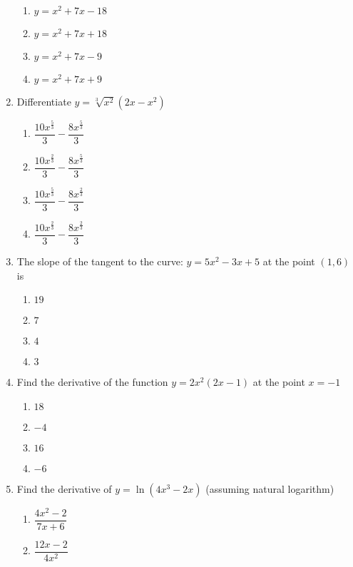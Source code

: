 \begin{multicols}{2}
\begin{enumerate}[label={\arabic*.}]
\begin{enumerate}[label={\Alph*.}]
        \item \(y = {x}^{2}+7x-18\)
        \item \(y = {x}^{2}+7x+18\)
        \item \(y = {x}^{2}+7x-9\)
        \item \(y = {x}^{2}+7x+9\)
      \end{enumerate}
    \item Differentiate \(y = \sqrt[3]{{x}^{2}}(2x-{x}^{2})\)
      \begin{enumerate}[label={\Alph*.}]
        \item \(\dfrac{10{x}^{\frac{5}{3}}}{3} -\dfrac{8{x}^{\frac{5}{3}}}{3}\) %
        \item \(\dfrac{10{x}^{\frac{2}{3}}}{3} -\dfrac{8{x}^{\frac{5}{3}}}{3}\) %
        \item \(\dfrac{10{x}^{\frac{5}{3}}}{3} -\dfrac{8{x}^{\frac{2}{3}}}{3}\)
        \item \(\dfrac{10{x}^{\frac{2}{3}}}{3} -\dfrac{8{x}^{\frac{2}{3}}}{3}\)
      \end{enumerate}
    \item The slope of the tangent to the curve: \(y=5{x}^{2}-3x+5\) at the point \((1,6)\) is
      \begin{enumerate}[label={\Alph*.}]
        \item \(19\)
        \item \(7\)
        \item \(4\)
        \item \(3\)
      \end{enumerate}
    \item Find the derivative of the function \(y=2{x}^{2}(2x-1)\) at the point \(x = -1\)
      \begin{enumerate}[label={\Alph*.}]
        \item \(18\)
        \item \(-4\)
        \item \(16\)
        \item \(-6\)
      \end{enumerate}
    \item Find the derivative of  \(y = \ln(4{x}^{3} - 2x)\) (assuming natural logarithm)
      \begin{enumerate}[label={\Alph*.}]
        \item \(\dfrac{4{x}^{2}-2}{7x+6}\)
        \item \(\dfrac{12x-2}{4{x}^{2}}\)

\end{enumerate}
\end{enumerate}
\end{multicols}
